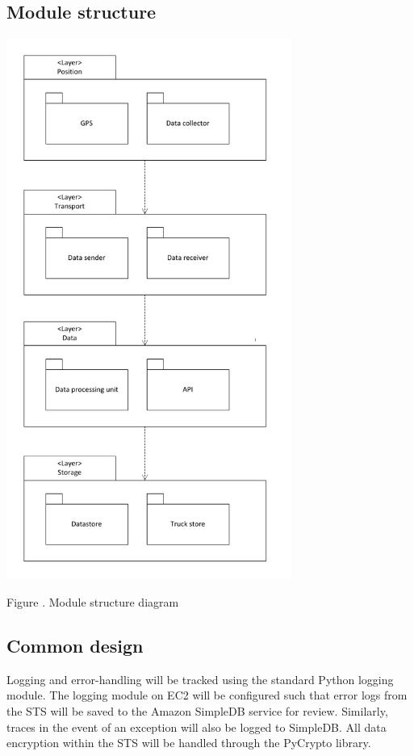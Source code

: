 \documentclass[a4paper,11pt]{report}
\newcommand{\mycaption}[1]{
  \addtocounter{figures}{1}
  Figure \arabic{figures}. #1
}
\begin{document}
\subsection{Module structure}
\label{sec:module-structure}


\begin{center}
  \includegraphics[width=0.7\textwidth]{figures/module_structure}\\
  \mycaption{Module structure diagram}
\end{center}

\subsection{Common design}
\label{sec:common-design}

Logging and error-handling will be tracked using the standard Python logging 
module. The logging module on EC2 will be configured such that error logs from
the STS will be saved to the Amazon SimpleDB service for review. Similarly,
traces in the event of an exception will also be logged to SimpleDB. All 
data encryption within the STS will be handled through the PyCrypto library.
\end{document}
